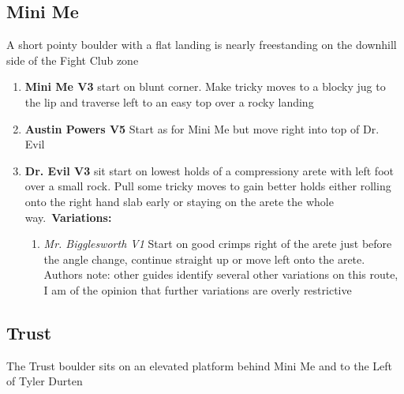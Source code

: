 \subsection*{Mini Me}\label{bf:Mini Me}
A short pointy boulder with a flat landing is nearly freestanding on the downhill side of the Fight Club zone

\label{pt:Austin Powers}
\begin{enumerate}[resume]
	\item\label{rt:Mini Me} \colorbox{green!20}{\textbf{Mini Me V3  } }
	\newline start on blunt corner. Make tricky moves to a blocky jug to the lip and traverse left to an easy top over a rocky landing\
	\item\label{rt:Austin Powers} \colorbox{RoyalBlue!20}{\textbf{Austin Powers V5    } }
	\newline Start as for Mini Me but move right into top of Dr. Evil\
	\item\label{rt:Dr. Evil} \colorbox{green!20}{\textbf{Dr. Evil V3    } }
	\newline sit start on lowest holds of a compressiony arete with left foot over a small rock. Pull some tricky moves to gain better holds either rolling onto the right hand slab early or staying on the arete the whole way.\
	\newline \textbf{Variations:}
	\begin{enumerate}
		\item\label{vr:Mr. Bigglesworth} \colorbox{green!20}{\emph{Mr. Bigglesworth V1 \ding{72}  }  }
		\newline Start on good crimps right of the arete just before the angle change, continue straight up or move left onto the arete. Authors note: other guides identify several other variations on this route, I am of the opinion that further variations are overly restrictive\
	\end{enumerate}
\end{enumerate}
\subsection*{Trust}\label{bf:Trust}
The Trust boulder sits on an elevated platform behind Mini Me and to the Left of Tyler Durten

